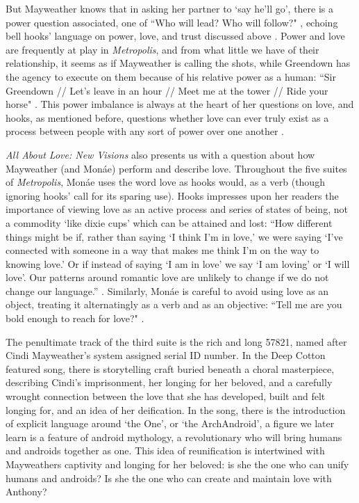 \documentclass[a4paper, 11pt]{article} %
\begin{document}
But Mayweather knows that in asking her partner to `say he'll go', there is a power question associated, one of ``Who will lead? Who will follow?" \cite{sayyouwillgo}, echoing bell hooks' language on power, love, and trust discussed above \cite{newvisions}.
Power and love are frequently at play in \emph{Metropolis}, and from what little we have of their relationship, it seems as if Mayweather is calling the shots, while Greendown has the agency to execute on them because of his relative power as a human: ``Sir Greendown // Let's leave in an hour // Meet me at the tower // Ride your horse" \cite{greendown}.
This power imbalance is always at the heart of her questions on love, and hooks, as mentioned before, questions whether love can ever truly exist as a process between people with any sort of power over one another \cite{newvisions}.

\emph{All About Love: New Visions} also presents us with a question about how Mayweather (and Mon\'ae) perform and describe love.
Throughout the five suites of \emph{Metropolis}, Mon\'ae uses the word love as hooks would, as a verb (though ignoring hooks' call for its sparing use).
Hooks impresses upon her readers the importance of viewing love as an active process and series of states of being, not a commodity `like dixie cups' which can be attained and lost:
``How different things might be if, rather than saying `I think I'm in love,' we were saying `I've connected with someone in a way that makes me think I'm on the way to knowing love.' Or if instead of saying `I am in love' we say `I am loving' or `I will love'. Our patterns around romantic love are unlikely to change if we do not change our language.'' \cite{newvisions}.
Similarly, Mon\'ae is careful to avoid using love as an object, treating it alternatingly as a verb and as an objective: ``Tell me are you bold enough to reach for love?" \cite{manymoons}.

The penultimate track of the third suite is the rich and long 57821, named after Cindi Mayweather's system assigned serial ID number.
In the Deep Cotton featured song, there is storytelling craft buried beneath a choral masterpiece, describing Cindi's imprisonment, her longing for her beloved, and a carefully wrought connection between the love that she has developed, built and felt longing for, and an idea of her deification.
In the song, there is the introduction of explicit language around `the One', or `the ArchAndroid', a figure we later learn is a feature of android mythology, a revolutionary who will bring humans and androids together as one.
This idea of reunification is intertwined with Mayweathers captivity and longing for her beloved: is she the one who can unify humans and androids? Is she the one who can create and maintain love with Anthony?
\end{document}

